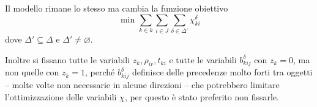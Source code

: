 Il modello rimane lo stesso ma cambia la funzione obiettivo
\begin{equation}
\text{ min } \sum_{k\in k}\sum_{i \in J}\sum_{\delta \in \Delta'} \chi_{ki}^\delta
\end{equation}
dove $\Delta' \subseteq \Delta$ e $\Delta' \neq \varnothing$.

Inoltre si fissano tutte le variabili $z_k, \rho_{ir}, t_{ki}$ e tutte le 
variabili $b_{kij}^\delta$ con $z_k = 0$, ma non quelle con $z_k = 1$, perché 
$b_{kij}^\delta$ definisce delle precedenze molto forti tra oggetti -- molte 
volte non necessarie in alcune direzioni -- che potrebbero limitare 
l'ottimizzazione delle variabili $\chi$, per questo è stato preferito non 
fissarle.

